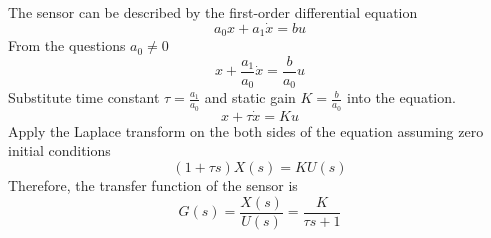 \noindent The sensor can be described by the first-order differential equation 
\begin{equation}
a_{\text{0}}x+a_{\text{1}}\dot{x}=bu
\end{equation}
\noindent From the questions $a_{\text{0}}\neq0$
\begin{equation}
x+\frac{a_{\text{1}}}{a_{\text{0}}}\dot{x}=\frac{b}{a_{\text{0}}}u
\end{equation}
\noindent Substitute time constant $\tau=\frac{a_{\text{1}}}{a_{\text{0}}}$ and static gain $K=\frac{b}{a_{\text{0}}}$ into the equation.
\begin{equation}
x+\tau\dot{x}=Ku
\end{equation}
\noindent Apply the Laplace transform on the both sides of the equation assuming zero initial conditions
\begin{equation}
(1+{\tau}s)X(s)=KU(s)
\end{equation}
\noindent Therefore, the transfer function of the sensor is
\begin{equation}
G(s)=\frac{X(s)}{U(s)}=\frac{K}{{\tau}s+1}
\end{equation}